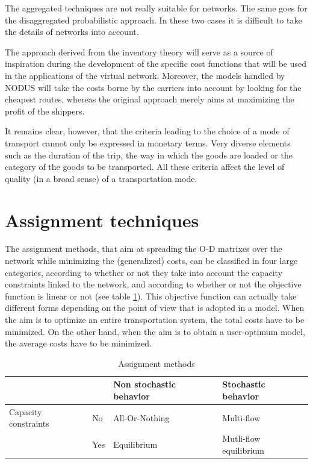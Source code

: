 The aggregated techniques are not really suitable for networks.  The same goes
for the disaggregated probabilistic approach.  In these two cases it is difficult
to take the details of networks into account.

The approach derived from the inventory theory will serve as a source of
inspiration during the development of the specific cost functions that will be
used in the applications of the virtual network.  Moreover, the models
handled by NODUS will take the costs borne by the carriers into account by
looking for the cheapest routes, whereas the original approach merely
aims at maximizing the profit of the shippers.

It remains clear, however, that the criteria leading to the choice of a mode of
transport cannot only be expressed in monetary terms.  Very diverse elements such as the duration of
the trip, the way in which the goods are loaded or the category of the goods to be
transported.  All these criteria affect the level of quality (in a broad sense)
of a transportation mode.



\section{Assignment techniques}

The assignment methods, that aim at spreading the O-D matrixes over the network
while minimizing the (generalized) costs, can be classified in four large
categories, according to whether or not they take into account the capacity
constraints linked to the network, and according to whether or not the objective
function is linear or not (see table \ref{tab2_7}).  This objective function can
actually take different forms depending on the point of view that is adopted in
a model.  When the aim is to optimize an entire transportation system, the total
costs have to be minimized.  On the other hand, when the aim is to obtain a
user-optimum model, the average costs have to be minimized.




\begin{table}[htbp]
\begin{center}
\begin{tabular}{llll}
\hline
& & Non stochastic behavior & Stochastic behavior \\
\hline
Capacity constraints& No & All-Or-Nothing & Multi-flow\\
& Yes & Equilibrium & Mutli-flow equilibrium\\
\hline
\end{tabular}
\caption{\label{tab2_7} Assignment methods}
\end{center}
\end{table}


